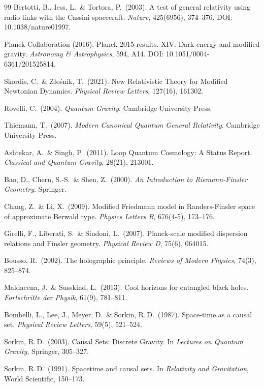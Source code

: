 \documentclass[11pt,a4paper]{article}
\begin{document}
\begin{thebibliography}{99}
Bertotti, B., Iess, L.\ \& Tortora, P.\ (2003).
A test of general relativity using radio links with the Cassini spacecraft.
\textit{Nature}, 425(6956), 374--376.
DOI: 10.1038/nature01997.

Planck Collaboration (2016).
Planck 2015 results. XIV. Dark energy and modified gravity.
\textit{Astronomy \& Astrophysics}, 594, A14.
DOI: 10.1051/0004-6361/201525814.

Skordis, C.\ \& Z{\l}o\'snik, T.\ (2021).
New Relativistic Theory for Modified Newtonian Dynamics.
\textit{Physical Review Letters}, 127(16), 161302.

Rovelli, C.\ (2004).
\textit{Quantum Gravity}. Cambridge University Press.

Thiemann, T.\ (2007).
\textit{Modern Canonical Quantum General Relativity}. Cambridge University Press.

Ashtekar, A.\ \& Singh, P.\ (2011).
Loop Quantum Cosmology: A Status Report.
\textit{Classical and Quantum Gravity}, 28(21), 213001.

Bao, D., Chern, S.-S.\ \& Shen, Z.\ (2000).
\textit{An Introduction to Riemann-Finsler Geometry}. Springer.

Chang, Z.\ \& Li, X.\ (2009).
Modified Friedmann model in Randers-Finsler space of approximate Berwald type.
\textit{Physics Letters B}, 676(4-5), 173--176.

Girelli, F., Liberati, S.\ \& Sindoni, L.\ (2007).
Planck-scale modified dispersion relations and Finsler geometry.
\textit{Physical Review D}, 75(6), 064015.

Bousso, R.\ (2002).
The holographic principle.
\textit{Reviews of Modern Physics}, 74(3), 825--874.

Maldacena, J.\ \& Susskind, L.\ (2013).
Cool horizons for entangled black holes.
\textit{Fortschritte der Physik}, 61(9), 781--811.

Bombelli, L., Lee, J., Meyer, D.\ \& Sorkin, R.\,D.\ (1987).
Space-time as a causal set.
\textit{Physical Review Letters}, 59(5), 521--524.

Sorkin, R.\,D.\ (2003).
Causal Sets: Discrete Gravity.
In \textit{Lectures on Quantum Gravity}, Springer, 305--327.

Sorkin, R.\,D.\ (1991).
Spacetime and causal sets.
In \textit{Relativity and Gravitation}, World Scientific, 150--173.


\end{thebibliography}
\end{document}
